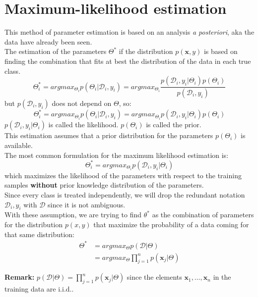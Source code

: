 \section{Maximum-likelihood estimation}
    \label{par:maximum_likelihood_estim}
    This method of parameter estimation is based on an analysis \textit{a posteriori}, aka the data have already been seen.\\
    The estimation of the parameters $\Theta^*$ if the distribution $p(\pmb{x}, y)$ is based on finding the combination that fits at best the distribution of the data in each true class.
    $$\Theta_i^* = argmax_{\Theta_i} p(\Theta_i|\mathcal{D}_i, y_i) = argmax_{\Theta_i} \frac{p(\mathcal{D}_i, y_i|\Theta_i)p(\Theta_i)}{p(\mathcal{D}_i, y_i)}$$
    but $p(\mathcal{D}_i, y_i)$ does not depend on $\Theta$, so:
    $$\Theta_i^* = argmax_{\Theta_i} p(\Theta_i|\mathcal{D}_i, y_i) = argmax_{\Theta_i} p(\mathcal{D}_i, y_i|\Theta_i)p(\Theta_i)$$
    $p(\mathcal{D}_i, y_i|\Theta_i)$ is called the likelihood. $p(\Theta_i)$ is called the prior.\\
    This estimation assumes that a prior distribution for the parameters $p(\Theta_i)$ is available.\\
    The most common formulation for the maximum likelihood estimation is:
    \begin{equation}
        \Theta_i^* = argmax_{\Theta_i} p(\mathcal{D}_i, y_i| \Theta_i)
        \label{eq:max_likelihood_common}
    \end{equation}
    which maximizes the likelihood of the parameters with respect to the training samples\textbf{ without } prior knowledge distribution of the parameters.\\
    
    Since every class is treated independently, we will drop the redundant notation $\mathcal{D}_i, y_i$ with $\mathcal{D}$ since it is not ambiguous.\\
    
    With these assumption, we are trying to find $\theta^*$ as the combination of parameters for the distribution $p(x, y)$ that maximize the probability of a data coming for that same distribution:
    \begin{align*}
		\Theta^* &= argmax_{\Theta} p(\mathcal{D} | \Theta)\\
		&= argmax_\Theta \prod_{j=1}^n p(\pmb{x}_j|\Theta)
	\end{align*}
	
	\textbf{Remark:}
	$p(\mathcal{D}| \Theta) = \prod_{j=1}^n p(\pmb{x}_j|\Theta)$ since the elements $\pmb{x}_1, \hdots, \pmb{x}_n$ in the training data are i.i.d..
    
